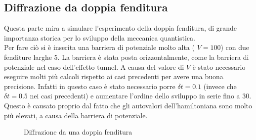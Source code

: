  \subsection{Diffrazione da doppia fenditura}
 Questa parte mira a simulare l'esperimento della doppia fenditura, di grande importanza storica per lo sviluppo della meccanica quantistica.\\
 Per fare ciò si è inserita una barriera di potenziale molto alta ( $V = 100$) con due fenditure larghe 5. La barriera è stata posta orizzontalmente, come la barriera di potenziale nel caso dell'effetto tunnel.
 A causa del valore di $V$ è stato necessario eseguire molti più calcoli rispetto ai casi precedenti per avere una buona precisione. Infatti in questo caso
 è stato necessario porre $\delta t = 0.1$ (invece che $\delta t = 0.5 $ nei casi precedenti) e aumentare l'ordine dello sviluppo in serie fino a 30.
 Questo è causato proprio dal fatto che gli autovalori dell'hamiltoniana sono molto più elevati, a causa della barriera di potenziale.
\begin{figure}[hp]
 \centering
 \caption{\small{Diffrazione da una doppia fenditura}}
 
 \end{figure}

